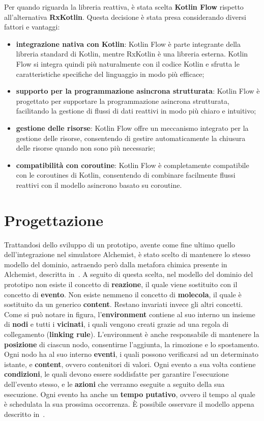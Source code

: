 \documentclass[12pt,a4paper,openright,twoside]{book}
\begin{document}
Per quando riguarda la libreria reattiva, è stata scelta \textbf{Kotlin Flow} rispetto all'alternativa \textbf{RxKotlin}. Questa decisione è stata presa considerando diversi fattori e vantaggi: 
\begin{itemize}
    \item \textbf{integrazione nativa con Kotlin}: Kotlin Flow è parte integrante della libreria standard di Kotlin, mentre RxKotlin è una libreria esterna. Kotlin Flow si integra quindi più naturalmente con il codice Kotlin e sfrutta le caratteristiche specifiche del linguaggio in modo più efficace;
    \item \textbf{supporto per la programmazione asincrona strutturata}: Kotlin Flow è progettato per supportare la programmazione asincrona strutturata, facilitando la gestione di flussi di dati reattivi in modo più chiaro e intuitivo;
    \item \textbf{gestione delle risorse}: Kotlin Flow offre un meccanismo integrato per la gestione delle risorse, consentendo di gestire automaticamente la chiusura delle risorse quando non sono più necessarie;
    \item \textbf{compatibilità con coroutine}: Kotlin Flow è completamente compatibile con le coroutines di Kotlin, consentendo di combinare facilmente flussi reattivi con il modello asincrono basato su coroutine. 
\end{itemize}

\section{Progettazione}
\label{sec:progettazione}
Trattandosi dello sviluppo di un prototipo, avente come fine ultimo quello dell'integrazione nel simulatore Alchemist, è stato scelto di mantenere lo stesso modello del dominio, astraendo però dalla metafora chimica presente in Alchemist, descritta in~. 
A seguito di questa scelta, nel modello del dominio del prototipo non esiste il concetto di \textbf{reazione}, il quale viene sostituito con il concetto di \textbf{evento}. Non esiste nemmeno il concetto di \textbf{molecola}, il quale è sostituito da un generico \textbf{content}. Restano invariati invece gli altri concetti. 
Come si può notare in figura, l'\textbf{environment} contiene al suo interno un insieme di \textbf{nodi} e tutti i \textbf{vicinati}, i quali vengono creati grazie ad una regola di collegamento (\textbf{linking rule}). L'environment è anche responsabile di mantenere la \textbf{posizione} di ciascun nodo, consentirne l'aggiunta, la rimozione e lo spostamento. 
Ogni nodo ha al suo interno \textbf{eventi}, i quali possono verificarsi ad un determinato istante, e \textbf{content}, ovvero contenitori di valori. 
Ogni evento a sua volta contiene \textbf{condizioni}, le quali devono essere soddisfatte per garantire l'esecuzione dell'evento stesso, e le \textbf{azioni} che verranno eseguite a seguito della sua esecuzione.
Ogni evento ha anche un \textbf{tempo putativo}, ovvero il tempo al quale è schedulata la sua prossima occorrenza.
È possibile osservare il modello appena descritto in~.
\end{document}

